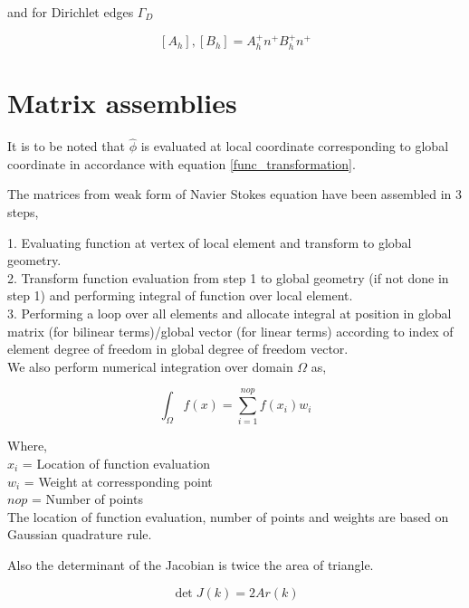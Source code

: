 \documentclass[a4paper]{book}
\begin{document}
and for Dirichlet edges $\Gamma_D$

\begin{equation} \label{Jump operator L2 for dirichlet}
[A_h],[B_h] = A_h^+ n^+ B_h^+ n^+ 
\end{equation}


\section{Matrix assemblies} \label{matrix_assembly_ch4}

It is to be noted that $\hat{\phi}$ is evaluated at local coordinate corresponding to global coordinate in accordance with equation \ref{func_transformation}.

The matrices from weak form of Navier Stokes equation have been assembled in 3 steps,

1. Evaluating function at vertex of local element and transform to global geometry.\\
2. Transform function evaluation from step 1 to global geometry (if not done in step 1) and performing integral of function over local element.\\
3. Performing a loop over all elements and allocate integral at position in global matrix (for bilinear terms)/global vector (for linear terms) according to index of element degree of freedom in global degree of freedom vector.\\

We also perform numerical integration over domain $\Omega$ as,

\begin{equation}\label{numerical integration}
\int_{\Omega} f(x) = \sum_{i=1}^{nop} f(x_i) w_i
\end{equation}

Where, \\

$x_i$ = Location of function evaluation\\
$w_i$ = Weight at corressponding point\\
$nop$ = Number of points\\

The location of function evaluation, number of points and weights are based on Gaussian quadrature rule.

Also the determinant of the Jacobian is twice the area of triangle.

\begin{equation}\label{determinant to area}
\det J(k) = 2Ar(k)
\end{equation}
\end{document}
